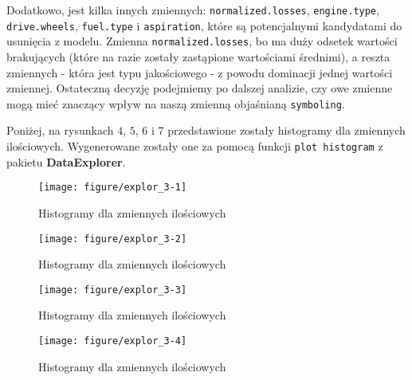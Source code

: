 \documentclass[12pt, a4paper]{article}\usepackage[]{graphicx}\usepackage[]{xcolor}
\makeatletter
\def\maxwidth{ %
  \ifdim\Gin@nat@width>\linewidth
    \linewidth
  \else
    \Gin@nat@width
  \fi
}
\newenvironment{knitrout}{}{} %
\makeatother
\begin{document}
Dodatkowo, jest kilka innych zmiennych: \texttt{normalized.losses}, \texttt{engine.type}, \texttt{drive.wheels}, \texttt{fuel.type} i \texttt{aspiration}, które są potencjalnymi kandydatami do usunięcia z modelu. Zmienna  \texttt{normalized.losses}, bo ma duży odsetek wartości brakujących (które na razie zostały zastąpione wartościami średnimi), a reszta zmiennych - która jest typu jakościowego - z powodu dominacji jednej wartości zmiennej. Ostateczną decyzję podejmiemy po dalszej analizie, czy owe zmienne mogą mieć znaczący wpływ na naszą zmienną objaśnianą  \texttt{symboling}. 
\par
Poniżej, na rysunkach $4$, $5$, $6$ i $7$ przedstawione zostały histogramy dla zmiennych ilościowych. Wygenerowane zostały one za pomocą funkcji \texttt{plot histogram} z pakietu \textbf{DataExplorer}.
\begin{knitrout}
\color{fgcolor}\begin{figure}[H]

{\centering \texttt{[image: figure/explor\_3-1]} 

}

\caption[Histogramy dla zmiennych ilościowych]{Histogramy dla zmiennych ilościowych}\label{fig:explor_3-1}
\end{figure}

\begin{figure}[H]

{\centering \texttt{[image: figure/explor\_3-2]} 

}

\caption[Histogramy dla zmiennych ilościowych]{Histogramy dla zmiennych ilościowych}\label{fig:explor_3-2}
\end{figure}

\begin{figure}[H]

{\centering \texttt{[image: figure/explor\_3-3]} 

}

\caption[Histogramy dla zmiennych ilościowych]{Histogramy dla zmiennych ilościowych}\label{fig:explor_3-3}
\end{figure}

\begin{figure}[H]

{\centering \texttt{[image: figure/explor\_3-4]} 

}

\caption[Histogramy dla zmiennych ilościowych]{Histogramy dla zmiennych ilościowych}\label{fig:explor_3-4}
\end{figure}

\end{knitrout}
\end{document}
